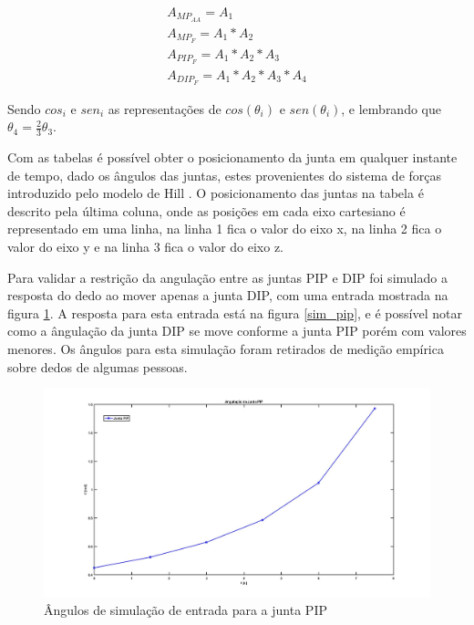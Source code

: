 \begin{align}
A_{MP_{AA}}= A_1 \label{matriz_junta1}\\
A_{MP_{F}}= A_1 * A_2 \label{matriz_junta2} \\
A_{PIP_{F}}= A_1 * A_2 * A_3 \label{matriz_junta3} \\
A_{DIP_{F}}= A_1 * A_2 * A_3 * A_4 \label{matriz_junta4}
\end{align}

Sendo $cos_i$ e $sen_i$ as representações de $cos(\theta_i)$ e $sen(\theta_i)$, e lembrando que $\theta_4 = \frac{2}{3}\theta_3$.

Com as tabelas é possível obter o posicionamento da junta em qualquer instante de tempo, dado os ângulos das juntas, estes provenientes do sistema de forças introduzido pelo modelo de Hill \cite{hill1938heat}. O posicionamento das juntas na tabela é descrito pela última coluna, onde as posições em cada eixo cartesiano é representado em uma linha, na linha 1 fica o valor do eixo x, na linha 2 fica o valor do eixo y e na linha 3 fica o valor do eixo z.

Para validar a restrição da angulação entre as juntas PIP e DIP foi simulado a resposta do dedo ao mover apenas a junta DIP, com uma entrada mostrada na figura \ref{ang_sim_pip}. A resposta para esta entrada está na figura \ref{sim_pip}, e é possível notar como a ângulação da junta DIP se move conforme a junta PIP porém com valores menores. Os ângulos para esta simulação foram retirados de medição empírica sobre dedos de algumas pessoas.

\begin{figure}[H]
\centering
\includegraphics[width = 1\textwidth]{img/angulacao_pip.jpg}
\caption[Ângulos de simulação de entrada para a junta PIP]{Ângulos de simulação de entrada para a junta PIP}
\label{ang_sim_pip}
\end{figure}

